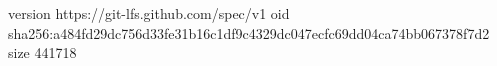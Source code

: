 version https://git-lfs.github.com/spec/v1
oid sha256:a484fd29dc756d33fe31b16c1df9c4329dc047ecfc69dd04ca74bb067378f7d2
size 441718
